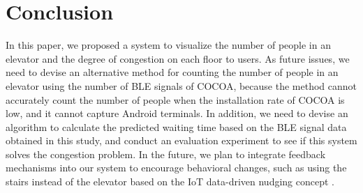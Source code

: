 \section{Conclusion}
In this paper, we proposed a system to visualize the number of people in an elevator and the degree of congestion on each floor to users. As future issues, we need to devise an alternative method for counting the number of people in an elevator using the number of BLE signals of COCOA, because the method cannot accurately count the number of people when the installation rate of COCOA is low, and it cannot capture Android terminals. In addition, we need to devise an algorithm to calculate the predicted waiting time based on the BLE signal data obtained in this study, and conduct an evaluation experiment to see if this system solves the congestion problem. In the future, we plan to integrate feedback mechanisms into our system to encourage behavioral changes, such as using the stairs instead of the elevator based on the IoT data-driven nudging concept \cite{nakamura2021iot}.
